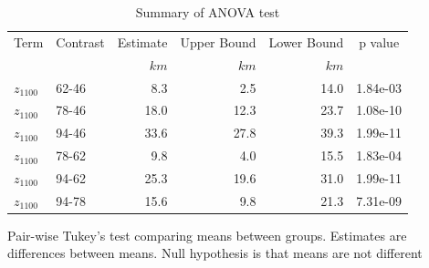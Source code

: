 \documentclass[draft,linenumbers]{agujournal2018}
\begin{document}
\begin{table}

\caption{\label{tab:anova}Summary of ANOVA test}
\centering
\fontsize{8}{10}\selectfont
\begin{threeparttable}
\begin{tabular}[t]{llrrrl}
\toprule
\multicolumn{1}{c}{Term} & \multicolumn{1}{c}{Contrast} & \multicolumn{1}{c}{Estimate} & \multicolumn{1}{c}{Upper Bound} & \multicolumn{1}{c}{Lower Bound} & \multicolumn{1}{c}{p value} \\
 &  & $km$ & $km$ & $km$ & \\
\midrule
$z_{1100}$ & 62-46 & 8.3 & 2.5 & 14.0 & 1.84e-03\\
$z_{1100}$ & 78-46 & 18.0 & 12.3 & 23.7 & 1.08e-10\\
$z_{1100}$ & 94-46 & 33.6 & 27.8 & 39.3 & 1.99e-11\\
$z_{1100}$ & 78-62 & 9.8 & 4.0 & 15.5 & 1.83e-04\\
$z_{1100}$ & 94-62 & 25.3 & 19.6 & 31.0 & 1.99e-11\\
\addlinespace
$z_{1100}$ & 94-78 & 15.6 & 9.8 & 21.3 & 7.31e-09\\
\bottomrule
\end{tabular}
\begin{tablenotes}
\item Pair-wise Tukey's test comparing means between groups. Estimates are differences between means. Null hypothesis is that means are not different
\end{tablenotes}
\end{threeparttable}
\end{table}
\end{document}
